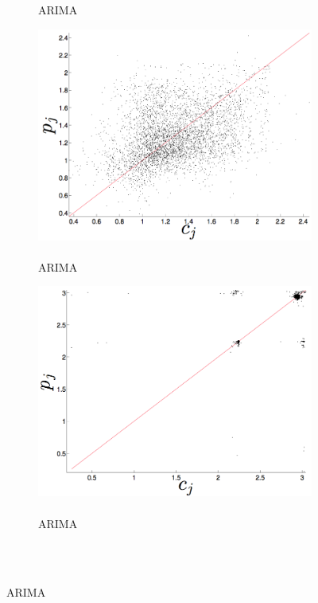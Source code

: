 \begin{figure}[htbp]
\begin{subfigure}{0.32\columnwidth}
    
    \caption{\col ARIMA}
    \label{fig:colARIMA}
  \end{subfigure}
  \begin{subfigure}{0.32\columnwidth}
    \includegraphics[width=\columnwidth]{figs/gccARIMAForecast.png}
    \caption{\gcc \\ ARIMA }
    \label{fig:gccARIMA}
  \end{subfigure}%
  \begin{subfigure}{0.32\columnwidth}
    \includegraphics[width=\columnwidth]{figs/svdfiveARIMAForecast.png}
    \caption{\svdfive \\ ARIMA }
    \label{fig:gccARIMA}
  \end{subfigure}%
  \\


\end{figure}
